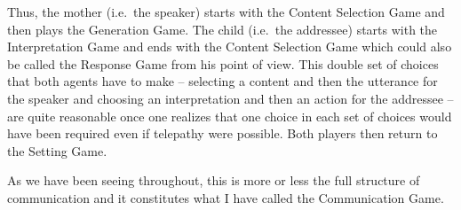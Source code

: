 Thus, the mother (i.e.\ the speaker) starts with the Content Selection Game and then plays the Generation Game. The child (i.e.\ the addressee) starts with the Interpretation Game and ends with the Content Selection Game which could also be called the Response Game from his point of view. This double set of choices that both agents have to make -- selecting a content and then the utterance for the speaker and choosing an interpretation and then an action for the addressee -- are quite reasonable once one realizes that one choice in each set of choices would have been required even if telepathy were possible. Both players then return to the Setting Game.

As we have been seeing throughout, this is more or less the full structure of communication and it constitutes what I have called the Communication Game. 

%


